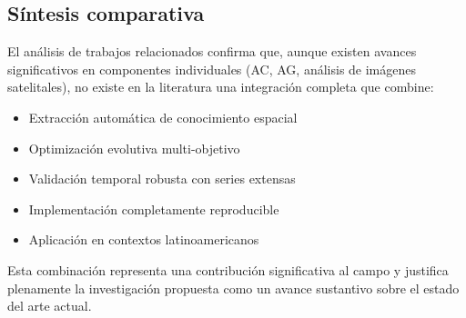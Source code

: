 \subsection{Síntesis comparativa}

El análisis de trabajos relacionados confirma que, aunque existen avances significativos en componentes individuales (AC, AG, análisis de imágenes satelitales), no existe en la literatura una integración completa que combine:

\begin{itemize}
	\item Extracción automática de conocimiento espacial
	\item Optimización evolutiva multi-objetivo
	\item Validación temporal robusta con series extensas
	\item Implementación completamente reproducible
	\item Aplicación en contextos latinoamericanos
\end{itemize}

Esta combinación representa una contribución significativa al campo y justifica plenamente la investigación propuesta como un avance sustantivo sobre el estado del arte actual.
